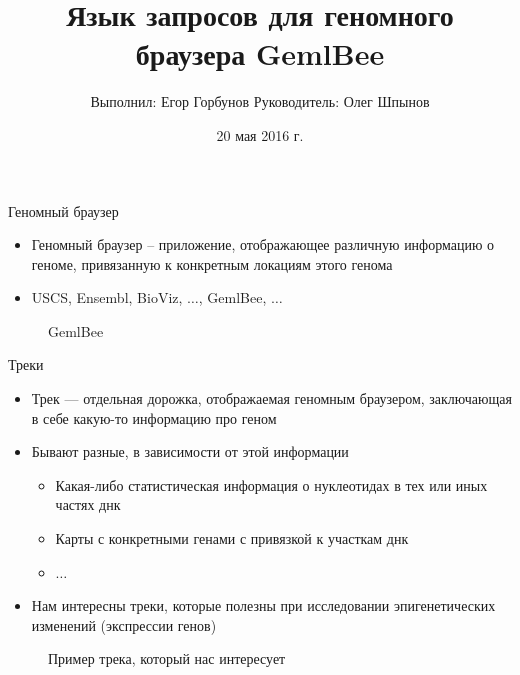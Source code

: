 
\makeatletter
{}
\makeatother
\graphicspath{{./fig/}}

\title{Язык запросов для геномного браузера GemlBee}
\author[Егор Горбунов]{
	\hspace{6cm} Выполнил: \hfill Егор Горбунов 
	\newline
	\hspace*{6cm} Руководитель:  \hfill Олег Шпынов
}
\date{20 мая 2016 г.}


\maketitle

\begin{frame}{Геномный браузер}

\begin{itemize}
	\item \alert{Геномный браузер} -- приложение, отображающее различную информацию о геноме, привязанную к конкретным локациям этого генома
	\item USCS, Ensembl, BioViz, $\ldots$, \alert{GemlBee}, $\ldots$
\end{itemize}

\begin{figure}[ht!]\color{cText}\renewcommand\color[2][]{} %
\centering
\def\svgwidth{3.5in}

\caption{GemlBee}
\end{figure}
\end{frame}

\begin{frame}{Треки}
\begin{itemize}
	\item \alert{Трек} --- отдельная дорожка, отображаемая геномным браузером, заключающая в себе какую-то информацию про геном
	\item Бывают разные, в зависимости от этой информации
		\begin{itemize}
			\item Какая-либо статистическая информация о нуклеотидах в тех или иных частях днк
			\item Карты с конкретными генами с привязкой к участкам днк
			\item $\ldots$
		\end{itemize}
	\item Нам интересны треки, которые полезны при исследовании эпигенетических изменений (экспрессии генов)
\end{itemize}
\begin{figure}[ht!]\color{cText}\renewcommand\color[2][]{} %
\centering
\def\svgwidth{3.5in}

\caption{Пример трека, который нас интересует}
\end{figure}
\end{frame}

